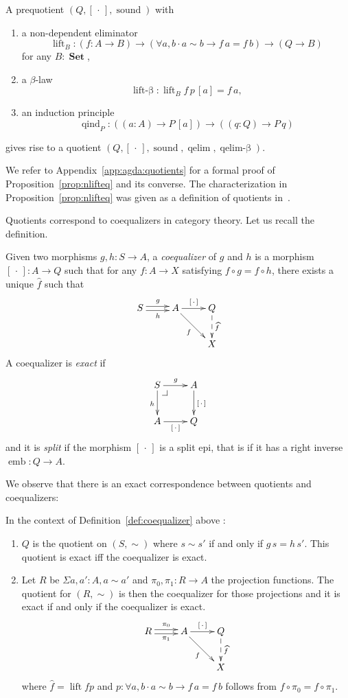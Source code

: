 \documentclass[envcountsame]{llncs}
\makeatletter
\newcommand{\dotph}{\,\cdot\,} %
\providecommand{\class}[1]{[#1]}
\providecommand{\dlift}[1]{\widehat{#1}}
\DeclareMathOperator{\Set}{\mathbf{Set}}
\DeclareMathOperator{\sound}{sound}
\DeclareMathOperator{\qelimbeta}{qelim-\beta}
\DeclareMathOperator{\qind}{qind}
\DeclareMathOperator{\emb}{emb}
\DeclareMathOperator{\qelim}{qelim}
\DeclareMathOperator{\lift}{lift}
\DeclareMathOperator{\liftbeta}{lift-\beta}
\renewcommand{\equiv}{=}
\newcommand{\pullbackcorner}[1][dr]{\save*!/#1-1.2pc/#1:(-1,1)@^{|-}\restore}
\makeatother
\begin{document}
\begin{proposition}\label{prop:nlifteq}
A prequotient $(Q,\class\dotph,\sound)$ with

\begin{enumerate}
\item a non-dependent eliminator $$\lift_B\colon (f\colon A \to B) \to (\forall a,b\cdot a\sim b \to f\,a \equiv f\,b) \to (Q \to B)$$ for any $B\colon\Set$,
\item a $\beta$-law $$\liftbeta  : \lift_B f \,p\,\class a\equiv f\,a,$$
\item an induction principle $$\qind_P\colon ((a\colon A)\to P \,\class a)\to ((q\colon Q)\to P\,q)$$
\end{enumerate}
gives rise to a quotient $(Q,\class\dotph,\sound,\qelim,\qelimbeta)$.
\end{proposition}
We refer to Appendix~\ref{app:agda:quotients} for a formal proof of Proposition~\ref{prop:nlifteq} and its converse. The characterization in Proposition~\ref{prop:nlifteq} was given as a definition of quotients in~\cite{hofmann1995thesis}.

\bigskip

Quotients correspond to coequalizers in category theory. Let us recall the definition.
\begin{definition}\label{def:coequalizer}
Given two morphisms $g,h : S\to A$, a \emph{coequalizer} of $g$ and $h$ is a morphism $\class\dotph:A\to Q$ such that for any $f:A\to X$ satisfying $f \circ g = f \circ h$, there exists a unique $\dlift f$ such that
\[\xymatrix{
S\ar@<0.5ex>[r]^g\ar@<-0.5ex>[r]_h& A\ar[r]^{\class\dotph}\ar[dr]_{f} & Q\ar@{-->}[d]^{\dlift f}\\
&&X
}\]
A coequalizer is \emph{exact} if
\[\xymatrix{
S\pullbackcorner\ar[r]^g\ar[d]_h & A\ar[d]^{\class\dotph} \\
A\ar[r]_{\class\dotph} & Q
}\]
and it is \emph{split} if the morphism $\class\dotph$ is a split epi, that is if it has a right inverse $\emb : Q \to A$.
\end{definition}

We observe that there is an exact correspondence between quotients and coequalizers:
\begin{proposition} In the context of Definition~\ref{def:coequalizer} above :
\begin{enumerate}
\item $Q$ is the quotient on $(S,\sim)$ where $s\sim s'$ if and only if $g\,s=h\,s'$.
This quotient is exact if{f} the coequalizer is exact.
\item Let $R$ be $\Sigma a,a':A,a\sim a'$ and $\pi_0,\pi_1 : R\to A$ the projection functions. The quotient for $(R,\sim)$ is then the coequalizer for those projections and it is exact if and only if the coequalizer is exact.
\[\xymatrix{
R\ar@<0.5ex>[r]^{\pi_0}\ar@<-0.5ex>[r]_{\pi_1}& A\ar[r]^{\class\dotph}\ar[dr]_{f} & Q\ar@{-->}[d]^{\dlift f}\\
&&X
}\]
where $\dlift f=\lift f p$ and $p \colon \forall a,b\cdot a\sim b \to f\,a \equiv f\,b$ follows from $f \circ \pi_0 = f \circ \pi_1$.
\end{enumerate}
\end{proposition}
\end{document}
